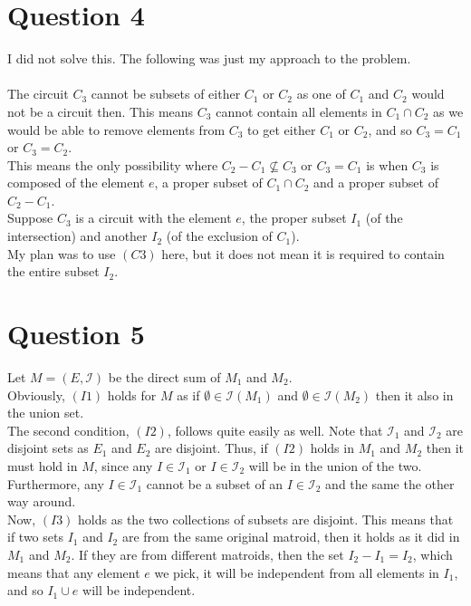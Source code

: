 \documentclass[a4paper, fleqn]{article}
\begin{document}
\section*{Question 4}
I did not solve this. The following was just my approach to the problem. \\
\\
The circuit $C_3$ cannot be subsets of either $C_1$ or $C_2$ as one of $C_1$ and $C_2$ would not be a circuit then. This means $C_3$ cannot contain all elements in $C_1\cap C_2$ as we would be able to remove elements from $C_3$ to get either $C_1$ or $C_2$, and so $C_3=C_1$ or $C_3=C_2$. \\
This means the only possibility where $C_2-C_1\not\subseteq C_3$ or $C_3=C_1$ is when  $C_3$ is composed of the element $e$, a proper subset of $C_1\cap C_2$ and a proper subset of $C_2-C_1$. \\
Suppose $C_3$ is a circuit with the element $e$, the proper subset $I_1$ (of the intersection) and another $I_2$ (of the exclusion of $C_1$). \\
My plan was to use $(C3)$ here, but it does not mean it is required to contain the entire subset $I_2$.

\section*{Question 5}
Let $M=(E,\mathcal{I})$ be the direct sum of $M_1$ and $M_2$. \\
Obviously, $(I1)$ holds for $M$ as if $\emptyset\in \mathcal{I}(M_1)$ and $\emptyset\in \mathcal{I}(M_2)$ then it also in the union set. \\
The second condition, $(I2)$, follows quite easily as well. Note that $\mathcal{I}_1$ and $\mathcal{I}_2$ are disjoint sets as $E_1$ and $E_2$ are disjoint. Thus, if $(I2)$ holds in $M_1$ and $M_2$ then it must hold in $M$, since any $I\in \mathcal{I}_1$ or $I\in \mathcal{I}_2$ will be in the union of the two. Furthermore, any $I\in \mathcal{I}_1$ cannot be a subset of an $I\in \mathcal{I}_2$ and the same the other way around. \\
Now, $(I3)$ holds as the two collections of subsets are disjoint. This means that if two sets $I_1$ and $I_2$ are from the same original matroid, then it holds as it did in $M_1$ and $M_2$. If they are from different matroids, then the set $I_2-I_1=I_2$, which means that any element $e$ we pick, it will be independent from all elements in $I_1$, and so $I_1\cup e$ will be independent.
\end{document}
